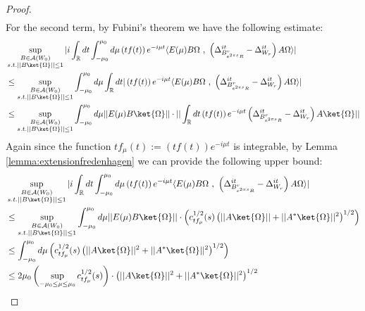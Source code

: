\documentclass[a4paper,11pt]{article}
\theoremstyle{definition}
\theoremstyle{remark}
\newcommand{\lb}{\left(}
\newcommand{\rb}{\right)}
\begin{document}
\begin{proof}
\begin{align}
    \end{align}
    For the second term, by Fubini's theorem we have the following estimate:
    \begin{align}
        \begin{split}
            &\sup_{\substack{B\in\mathcal{A}(W_0)\\s.t.||B\ket{\Omega}||\leq 1}}|i\int_\mathbb{R} dt \int_{-\mu_0}^{\mu_0}d\mu \lb tf(t)\rb e^{-i\mu t}\langle E(\mu)B\Omega\text{ , }\lb\Delta^{it}_{B^r_{e^{2\pi s}R}} - \Delta^{it}_{W_r}\rb A\Omega \rangle|
            \\&
            \leq \sup_{\substack{B\in\mathcal{A}(W_0)\\s.t.||B\ket{\Omega}||\leq 1}}\int_{-\mu_0}^{\mu_0}d\mu\int_\mathbb{R} dt |\lb tf(t)\rb e^{-i\mu t}\langle E(\mu)B\Omega\text{ , }\lb \Delta^{it}_{B^r_{e^{2\pi s}R}} - \Delta^{it}_{W_r} \rb A\Omega \rangle|
            \\&
            \leq \sup_{\substack{B\in\mathcal{A}(W_0)\\s.t.||B\ket{\Omega}||\leq 1}}\int_{-\mu_0}^{\mu_0}d\mu ||E(\mu) B\ket{\Omega}||\cdot||\int_\mathbb{R} dt\lb tf(t) \rb e^{-i\mu t}\lb\Delta^{it}_{B^r_{e^{2\pi s}R}}- \Delta^{it}_{W_r}\rb A\ket{\Omega}||
        \end{split}
    \end{align}
    Again since the function $tf_\mu(t):= \lb tf(t) \rb e^{-i\mu t}$ is integrable, by Lemma \ref{lemma:extensionfredenhagen} we can provide the following upper bound:
    \begin{align}
        \begin{split}
            &\sup_{\substack{B\in\mathcal{A}(W_0)\\s.t.||B\ket{\Omega}||\leq 1}}|i\int_\mathbb{R} dt \int_{-\mu_0}^{\mu_0}d\mu \lb tf(t)\rb e^{-i\mu t}\langle E(\mu)B\Omega\text{ , }\lb\Delta^{it}_{B^r_{e^{2\pi s}R}} - \Delta^{it}_{W_r}\rb A\Omega \rangle|
            \\&
            \leq \sup_{\substack{B\in\mathcal{A}(W_0)\\s.t.||B\ket{\Omega}||\leq 1}}\int_{-\mu_0}^{\mu_0}d\mu ||E(\mu)B\ket{\Omega}||\cdot\lb c^{1/2}_{t f_\mu}(s)\lb||A\ket{\Omega}|| + ||A^*\ket{\Omega}||^2\rb^{1/2}\rb
            \\&
            \leq \int_{-\mu_0}^{\mu_0}d\mu \lb c^{1/2}_{tf_\mu}(s)\lb||A\ket{\Omega}||^2 + ||A^*\ket{\Omega}||^2\rb^{1/2}\rb 
            \\&
            \leq 2\mu_0\lb\sup_{-\mu_0\leq \mu\leq \mu_0}c^{1/2}_{tf_\mu}(s)\rb\cdot\lb||A\ket{\Omega}||^2 + ||A^*\ket{\Omega}||^2\rb^{1/2}

\end{split}
\end{align}
\end{proof}
\end{document}
